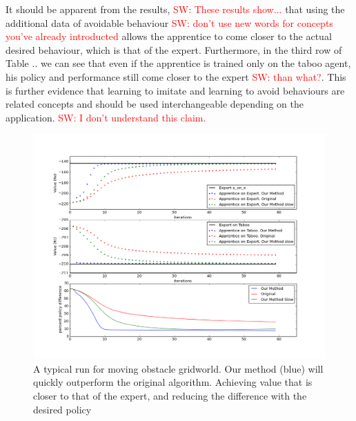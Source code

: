 \documentclass[letterpaper]{article}
\newcommand{\sw}[1]{\textcolor{red}{SW: #1}}
\newcommand{\jm}[1]{\textcolor{blue}{Joao: #1}}
\newcommand{\sw}[1]{}
\newcommand{\jm}[1]{}
\begin{document}
It should be apparent from the results, \sw{These results show...} that using the additional data of avoidable behaviour \sw{don't use new words for concepts you've already introducted} allows the apprentice to 
come closer to the actual desired behaviour, which is that of the expert. Furthermore, in the third row of Table .. we can see that
even if the apprentice is trained only on the taboo agent, his policy and performance still come closer to the expert \sw{than what?}. This is further
evidence that learning to imitate and learning to avoid behaviours are related concepts and should be used interchangeable depending on the application. \sw{I don't understand this claim.}

\begin{figure}[t]
  \centering
  \includegraphics[bb=0 0 749 576,width=0.9\columnwidth]{images/testgraph}
  \caption{A typical run for moving obstacle gridworld. Our method (blue) will quickly outperform the original algorithm. Achieving value that is closer to that of the expert, and reducing the difference with the desired policy\label{fig:results}}
\end{figure}
\end{document}
